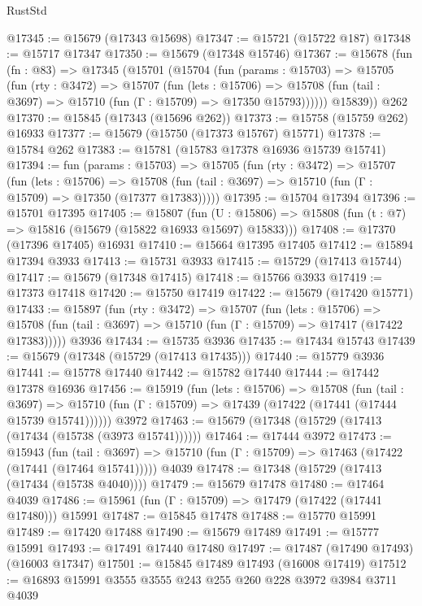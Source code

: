\begin{lexlean}{RustStd}
\begin{coremodule}
{\begin{coremodule}
{{{{{{{{{{{{{{{{{{{{{{{{{{{{{{{{{{{{{{{{{{{{{{{@17345 := @15679 (@17343 @15698)
@17347 := @15721 (@15722 @187)
@17348 := @15717 @17347
@17350 := @15679 (@17348 @15746)
@17367 := @15678
    (fun (fn : @83) =>
    @17345
      (@15701
        (@15704
          (fun (params : @15703) =>
          @15705
            (fun (rty : @3472) =>
            @15707
              (fun (lets : @15706) =>
              @15708 (fun (tail : @3697) => @15710 (fun (Γ : @15709) => @17350 @15793))))))
        @15839))
    @262
@17370 := @15845 (@17343 (@15696 @262))
@17373 := @15758 (@15759 @262) @16933
@17377 := @15679 (@15750 (@17373 @15767) @15771)
@17378 := @15784 @262
@17383 := @15781 (@15783 @17378 @16936 @15739 @15741)
@17394 := fun (params : @15703) =>
  @15705
    (fun (rty : @3472) =>
    @15707
      (fun (lets : @15706) =>
      @15708 (fun (tail : @3697) => @15710 (fun (Γ : @15709) => @17350 (@17377 @17383)))))
@17395 := @15704 @17394
@17396 := @15701 @17395
@17405 := @15807
    (fun (U : @15806) => @15808 (fun (t : @7) => @15816 (@15679 (@15822 @16933 @15697) @15833)))
@17408 := @17370 (@17396 @17405) @16931
@17410 := @15664 @17395 @17405
@17412 := @15894 @17394 @3933
@17413 := @15731 @3933
@17415 := @15729 (@17413 @15744)
@17417 := @15679 (@17348 @17415)
@17418 := @15766 @3933
@17419 := @17373 @17418
@17420 := @15750 @17419
@17422 := @15679 (@17420 @15771)
@17433 := @15897
    (fun (rty : @3472) =>
    @15707
      (fun (lets : @15706) =>
      @15708 (fun (tail : @3697) => @15710 (fun (Γ : @15709) => @17417 (@17422 @17383)))))
    @3936
@17434 := @15735 @3936
@17435 := @17434 @15743
@17439 := @15679 (@17348 (@15729 (@17413 @17435)))
@17440 := @15779 @3936
@17441 := @15778 @17440
@17442 := @15782 @17440
@17444 := @17442 @17378 @16936
@17456 := @15919
    (fun (lets : @15706) =>
    @15708
      (fun (tail : @3697) =>
      @15710 (fun (Γ : @15709) => @17439 (@17422 (@17441 (@17444 @15739 @15741))))))
    @3972
@17463 := @15679 (@17348 (@15729 (@17413 (@17434 (@15738 (@3973 @15741))))))
@17464 := @17444 @3972
@17473 := @15943
    (fun (tail : @3697) => @15710 (fun (Γ : @15709) => @17463 (@17422 (@17441 (@17464 @15741)))))
    @4039
@17478 := @17348 (@15729 (@17413 (@17434 (@15738 @4040))))
@17479 := @15679 @17478
@17480 := @17464 @4039
@17486 := @15961 (fun (Γ : @15709) => @17479 (@17422 (@17441 @17480))) @15991
@17487 := @15845 @17478
@17488 := @15770 @15991
@17489 := @17420 @17488
@17490 := @15679 @17489
@17491 := @15777 @15991
@17493 := @17491 @17440 @17480
@17497 := @17487 (@17490 @17493) (@16003 @17347)
@17501 := @15845 @17489 @17493 (@16008 @17419)
@17512 := @16893 @15991 @3555 @3555 @243 @255 @260 @228 @3972 @3984 @3711 @4039
}}}}}}}}}}}}}}}}}}}}}}}}}}}}}}}}}}}}}}}}}}}}}}}
\end{coremodule}}
\end{coremodule}
\end{lexlean}
